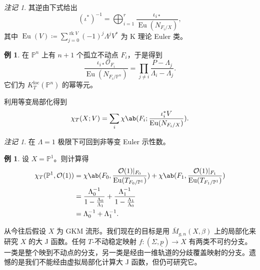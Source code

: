 \documentclass{amsart}
\theoremstyle{definition}
\newtheorem{exm}[thm]{例}
\theoremstyle{remark}
\newtheorem{rmk}[thm]{注记}
\theoremstyle{plain}
\theoremstyle{definition}
\theoremstyle{remark}
\renewcommand{\P}{\mathbb{P}}
\newcommand{\mc}[1]{\mathcal{#1}}
\newcommand{\mr}[1]{\mathrm{#1}}
\newcommand{\on}[1]{\operatorname{#1}}
\newcommand{\ul}[1]{\underline{#1}}
\newcommand{\1}{\mathbf{1}}
\newcommand{\2}{\mathbf{2}}
\newcommand{\3}{\mathbf{3}}
\newcommand{\loc}{\mr{loc}}
\begin{document}
\begin{rmk}
    其逆由下式给出
    \[ (\iota^*)^{-1} = \bigoplus_{i=1}^r \frac{\iota_{i*}}{\on{Eu}(N_{F_i/X})}, \]
    其中 \(\on{Eu}(V) \coloneqq \sum_{j = 0}^{\on{rk} V} (-1)^j \Lambda^j V^*\) 为 K 理论 Euler 类。
\end{rmk}

\begin{exm}
    在 \(\P^n\) 上有 \(n+1\) 个孤立不动点 \(F_i\)，于是得到
    \[ \frac{\iota_{i*} \mc{O}_{F_i}}{\on{Eu}(N_{F_i/\P^n})} = \prod_{j \neq i} \frac{P - \Lambda_j}{\Lambda_i - \Lambda_j}. \]
    它们为 \(K_T^{\loc}(\P^n)\) 的幂等元。
\end{exm}

利用等变局部化得到
\[ \chi_T(X; V) = \sum_i \chi\ab(F_i; \frac{\iota_i^* V}{\on{Eu}(N_{F_i/X})}). \]

\begin{rmk}
    在 \(\Lambda = 1\) 极限下可回到非等变 Euler 示性数。
\end{rmk}

\begin{exm}
    设 \(X = \P^1\)。则计算得
    \begin{align*}
        \chi_T(\P^1, \mc{O}(1)) &= \chi\ab(F_0, \frac{\mc{O}(1)|_{F_0}}{\on{Eu}(T_{F_0/\P^1})}) + \chi\ab(F_1, \frac{\mc{O}(1)|_{F_1}}{\on{Eu}(T_{F_1/\P^1})}) \\
        &= \frac{\Lambda_0^{-1}}{1 - \frac{\Lambda_0}{\Lambda_1}} + \frac{\Lambda_1^{-1}}{1 - \frac{\Lambda_1}{\Lambda_0}} \\
        &= \Lambda_0^{-1} + \Lambda_1^{-1}.
    \end{align*}
\end{exm}

从今往后假设 \(X\) 为 GKM 流形。我们现在的目标是用 \(\bar{M}_{g,n}(X, \beta)\) 上的局部化来研究 \(X\) 的大 J 函数。任何 \(T\)-不动稳定映射 \(f \colon (\Sigma, \ul{p}) \to X\) 有两类不可约分支。一类是整个映到不动点的分支，另一类是经由一维轨道的分歧覆盖映射的分支。遗憾的是我们不能经由虚拟局部化计算大 J 函数，但仍可研究它。
\end{document}
